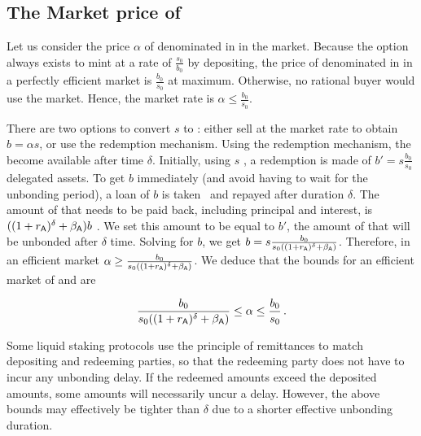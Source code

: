 

\subsection{The Market price of \stasset}\label{sec:stasset-price}

Let us consider the price $\alpha$ of \stasset denominated in \asset in the market.
Because the option always exists to mint at a rate of $\frac{s_0}{b_0}$ by
depositing, the price of \stasset denominated in \asset in a perfectly
efficient market is $\frac{b_0}{s_0}$ at maximum. Otherwise, no
rational buyer would use the market. Hence, the market rate is
$\alpha \leq \frac{b_0}{s_0}$.

There are two options to convert $s$ \stasset to \asset: either sell
at the market rate to obtain $b = \alpha s$, or use the redemption mechanism.
Using the redemption mechanism, the \assets become available after
time $\delta$.
Initially, using $s$ \stasset, a redemption is made of $b' = s \frac{b_0}{s_0}$
delegated assets. To get $b$ \asset immediately (and avoid having to wait
for the unbonding period), a loan of $b$ \asset is taken~\cite{liquid-staking-report} and
repayed after duration $\delta$. The amount of \asset that needs to be paid back,
including principal and interest, is $((1 + r_{\textsf{A}})^\delta + \beta_{\textsf{A}})b$ \asset.
We set this amount to be equal to $b'$, the amount of \assets that will be
unbonded after $\delta$ time. Solving for $b$, we get
$b = s \frac{b_0}{s_0 ((1 + r_{\textsf{A}})^\delta + \beta_{\textsf{A}})}$.
Therefore, in an efficient market $\alpha \geq \frac{b_0}{s_0 ((1 + r_{\textsf{A}})^\delta + \beta_{\textsf{A}})}$.
We deduce that the bounds for an efficient market of \asset and \stasset are

\[
  \frac{b_0}{s_0 ((1 + r_{\textsf{A}})^\delta + \beta_{\textsf{A}})} \leq \alpha \leq \frac{b_0}{s_0}\,.
\]

Some liquid staking protocols use the principle of remittances to match depositing and
redeeming parties, so that the redeeming party does not have to incur any unbonding delay.
If the redeemed amounts exceed the deposited amounts, some amounts will necessarily uncur
a delay. However, the above bounds may effectively be tighter than $\delta$ due to
a shorter effective unbonding duration.


